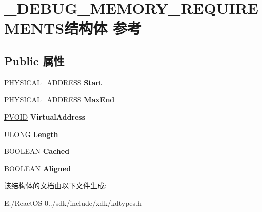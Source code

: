 \hypertarget{struct___d_e_b_u_g___m_e_m_o_r_y___r_e_q_u_i_r_e_m_e_n_t_s}{}\section{\+\_\+\+D\+E\+B\+U\+G\+\_\+\+M\+E\+M\+O\+R\+Y\+\_\+\+R\+E\+Q\+U\+I\+R\+E\+M\+E\+N\+T\+S结构体 参考}
\label{struct___d_e_b_u_g___m_e_m_o_r_y___r_e_q_u_i_r_e_m_e_n_t_s}
\subsection*{Public 属性}
\begin{DoxyCompactItemize}
\item 
\mbox{\label{struct___d_e_b_u_g___m_e_m_o_r_y___r_e_q_u_i_r_e_m_e_n_t_s_a1c69804354c2296a127bb48924b69329}} 
\hyperlink{union___l_a_r_g_e___i_n_t_e_g_e_r}{P\+H\+Y\+S\+I\+C\+A\+L\+\_\+\+A\+D\+D\+R\+E\+SS} {\bfseries Start}
\item 
\mbox{\label{struct___d_e_b_u_g___m_e_m_o_r_y___r_e_q_u_i_r_e_m_e_n_t_s_a43c4a7e75fbf8579f7be2e212f890a43}} 
\hyperlink{union___l_a_r_g_e___i_n_t_e_g_e_r}{P\+H\+Y\+S\+I\+C\+A\+L\+\_\+\+A\+D\+D\+R\+E\+SS} {\bfseries Max\+End}
\item 
\mbox{\label{struct___d_e_b_u_g___m_e_m_o_r_y___r_e_q_u_i_r_e_m_e_n_t_s_a6f8788d0064e066e8f2a85183cc3689f}} 
\hyperlink{interfacevoid}{P\+V\+O\+ID} {\bfseries Virtual\+Address}
\item 
\mbox{\label{struct___d_e_b_u_g___m_e_m_o_r_y___r_e_q_u_i_r_e_m_e_n_t_s_ac1ed07d93bf1f92be01fd369afbe2543}} 
U\+L\+O\+NG {\bfseries Length}
\item 
\mbox{\label{struct___d_e_b_u_g___m_e_m_o_r_y___r_e_q_u_i_r_e_m_e_n_t_s_a31ef81468f550322a5193a0997d54d60}} 
\hyperlink{_processor_bind_8h_a112e3146cb38b6ee95e64d85842e380a}{B\+O\+O\+L\+E\+AN} {\bfseries Cached}
\item 
\mbox{\label{struct___d_e_b_u_g___m_e_m_o_r_y___r_e_q_u_i_r_e_m_e_n_t_s_a61b7ecb8d843e154ecb8a22f9666605d}} 
\hyperlink{_processor_bind_8h_a112e3146cb38b6ee95e64d85842e380a}{B\+O\+O\+L\+E\+AN} {\bfseries Aligned}
\end{DoxyCompactItemize}


该结构体的文档由以下文件生成\+:\begin{DoxyCompactItemize}
\item 
E\+:/\+React\+O\+S-\/0../sdk/include/xdk/kdtypes.\+h\end{DoxyCompactItemize}
